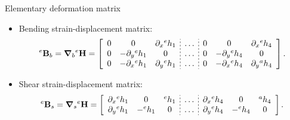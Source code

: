 \documentclass[aspectratio=169]{beamer}
\begin{document}
\begin{frame}{Elementary deformation matrix}
  \begin{itemize}
    \item Bending strain-displacement matrix:
          $${}^e\mathbf B_b=\boldsymbol\nabla_b {}^e\mathbf H=\left[
              \begin{array}{ccc;{2pt/2pt}c;{2pt/2pt}ccc}
                0 & 0                   & \partial_x{}^e h_1 & \dots & 0 & 0                   & \partial_x{}^e h_4 \\
                0 & -\partial_y{}^e h_1 & 0                  & \dots & 0 & -\partial_y{}^e h_4 & 0                  \\
                0 & -\partial_x{}^e h_1 & \partial_y{}^e h_1 & \dots & 0 & -\partial_x{}^e h_4 & \partial_y{}^a h_4 \\
              \end{array} \right].$$

    \item Shear strain-displacement matrix:
          $${}^e\mathbf B_s=\boldsymbol\nabla_s {}^e\mathbf H=\left[
              \begin{array}{ccc;{2pt/2pt}c;{2pt/2pt}ccc}
                \partial_x{}^e h_1 & 0         & {}^e h_1 & \dots & \partial_x{}^e h_4 & 0         & {}^a h_4 \\
                \partial_y{}^e h_1 & -{}^e h_1 & 0        & \dots & \partial_y{}^e h_4 & -{}^e h_4 & 0        \\
              \end{array} \right].$$
          \vspace{0.2cm}
  \end{itemize}
\end{frame}
\end{document}
